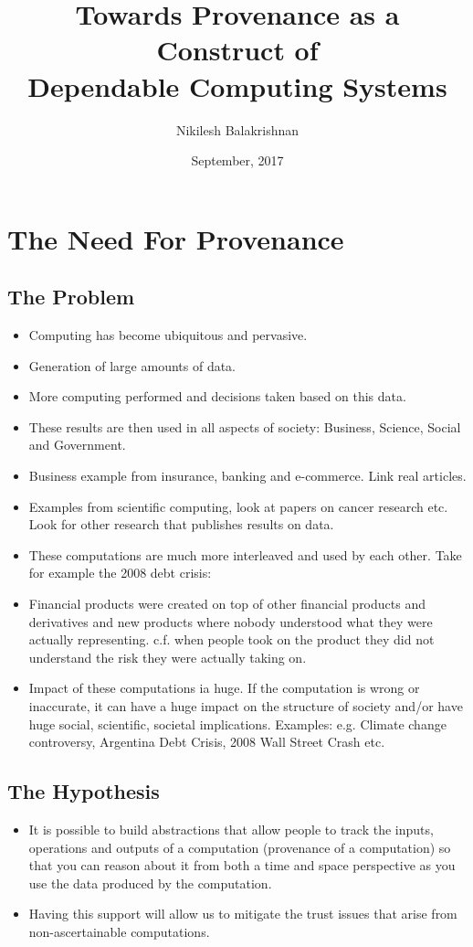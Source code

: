 \documentclass[withindex,glossary]{cam-thesis}
\title{Towards Provenance as a Construct of \\
Dependable Computing Systems}
\author{Nikilesh Balakrishnan}
\date{September, 2017}
\begin{document}
\frontmatter{}



\chapter{The Need For Provenance}

\section{The Problem}
\begin{itemize}
\item Computing has become ubiquitous and pervasive.
\item Generation of large amounts of data.
\item More computing performed and decisions taken based on this data.
\item These results are then used in all aspects of society: Business, Science, Social and Government.
\item Business example from insurance, banking and e-commerce. Link real articles.
\item Examples from scientific computing, look at papers on cancer research etc. Look for other research that publishes results on data.
\item These computations are much more interleaved and used by each other. Take for example the 2008 debt crisis:
\item Financial products were created on top of other financial products and derivatives and new products where nobody understood
what they were actually representing. c.f. when people took on the product they did not understand the risk they were actually taking on.
\item Impact of these computations ia huge. If the computation is wrong or inaccurate, it can have a huge impact on the structure of
society and/or have huge social, scientific, societal implications. Examples: e.g. Climate change controversy, Argentina Debt Crisis,
2008 Wall Street Crash etc.
\end{itemize}

\section{The Hypothesis}
\begin{itemize}
\item It is possible to build abstractions that allow people to track the inputs, operations and outputs of a computation
(provenance of a computation) so that you can reason about it from both a time and space perspective as you use the data
produced by the computation.
\item Having this support will allow us to mitigate the trust issues that arise from non-ascertainable computations.
\end{itemize}
\end{document}
